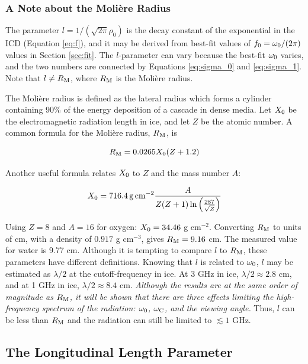 \documentclass[amsmath,amssymb,aps,prd,10pt,twocolumn]{revtex4}
\begin{document}
\subsubsection{A Note about the Moli\`{e}re Radius}

The parameter $l = 1/(\sqrt{2\pi}\rho_0)$ is the decay constant of the exponential in the ICD (Equation \ref{eq:f}), and it may be derived from best-fit values of $f_{\rm 0} = \omega_{\rm 0}/(2\pi)$ values in Section \ref{sec:fit}.  The $l$-parameter can vary because the best-fit $\omega_{\rm 0}$ varies, and the two numbers are connected by Equations \ref{eq:sigma_0} and \ref{eq:sigma_1}.  Note that $l \neq R_{\rm M}$, where $R_{\rm M}$ is the Moli\`{e}re radius.

The Moli\`{e}re radius is defined as the lateral radius which forms a cylinder containing 90\% of the energy deposition of a cascade in dense media.  Let $X_{\rm 0}$ be the electromagnetic radiation length in ice, and let $Z$ be the atomic number.  A common formula for the Moli\`{e}re radius, $R_{\rm M}$, is

\begin{equation}
R_{\rm M} = 0.0265 X_{\rm 0} (Z + 1.2)
\end{equation}

Another useful formula relates $X_{\rm 0}$ to $Z$ and the mass number $A$:

\begin{equation}
X_{\rm 0} = \SI{716.4}{\g\per\cm\squared} \frac{A}{Z(Z+1) \ln\left(\frac{287}{\sqrt{Z}}\right)}
\end{equation}

Using $Z = 8$ and $A = 16$ for oxygen: $X_{\rm 0} = 34.46$ g cm$^{-2}$. Converting $R_{\rm M}$ to units of cm, with a density of $0.917$ g cm$^{-3}$, gives $R_{\rm M} = 9.16$ cm.  The measured value for water is 9.77 cm.  Although it is tempting to compare $l$ to $R_{\rm M}$, these parameters have different definitions. Knowing that $l$ is related to $\omega_{\rm 0}$, $l$ may be estimated as $\lambda/2$ at the cutoff-frequency in ice.  At 3 GHz in ice, $\lambda/2 \approx 2.8$ cm, and at 1 GHz in ice, $\lambda/2 \approx 8.4$ cm.  \textit{Although the results are at the same order of magnitude as $R_{\rm M}$, it will be shown that there are three effects limiting the high-frequency spectrum of the radiation: $\omega_{\rm 0}$, $\omega_{\rm C}$, and the viewing angle.}  Thus, $l$ can be less than $R_{\rm M}$ and the radiation can still be limited to $\lesssim 1$ GHz.  

\subsection{The Longitudinal Length Parameter}
\label{sec:ff2}
\end{document}
